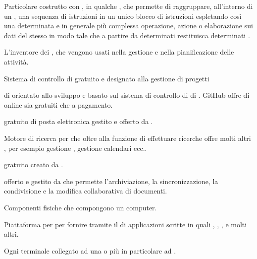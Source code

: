 {Particolare costrutto con , in qualche , che permette di raggruppare, all'interno di un , una sequenza di istruzioni in un unico blocco di istruzioni espletando così una determinata e in generale più complessa operazione, azione o elaborazione sui dati del  stesso in modo tale che a partire da determinati  restituisca determinati .}



{L'inventore dei , che vengono usati nella gestione e nella pianificazione delle attività.}


{Sistema di controllo di   gratuito e  designato alla gestione di progetti }


{ di   orientato allo sviluppo  e basato sul sistema di controllo di  di . GitHub offre  di  online sia gratuiti che a pagamento.}


{ gratuito di posta elettronica gestito e offerto da .}

{Motore di ricerca per  che oltre alla funzione di effettuare ricerche offre molti altri , per esempio gestione , gestione calendari ecc..} 


{  gratuito creato da .}


{ offerto e gestito da  che permette l'archiviazione, la sincronizzazione, la condivisione e la modifica collaborativa di documenti.}



{Componenti fisiche che compongono un computer.}


{Piattaforma  per per fornire  tramite il  di applicazioni scritte in  quali , , , e molti altri.}


{Ogni terminale collegato ad una  o più in particolare ad .}


